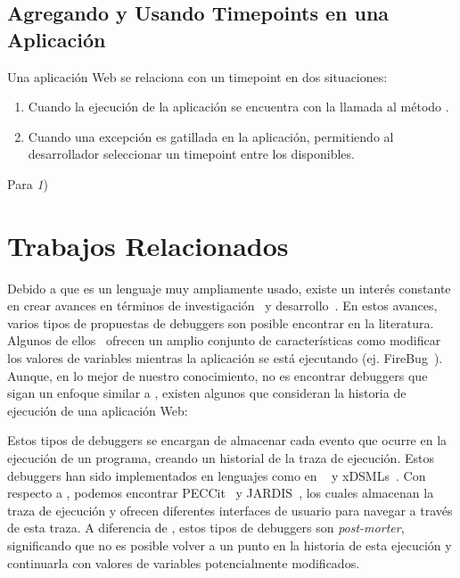 \documentclass[conference]{IEEEtran}
\begin{document}
\subsection{Agregando y Usando Timepoints en una Aplicaci\'on}
\label{sec:utime}

Una aplicaci\'on Web se relaciona con un timepoint en dos situaciones: 
\begin{enumerate}

	\item Cuando la ejecuci\'on de la aplicaci\'on se encuentra con la llamada al m\'etodo .
	
	\smallskip
	
	\item Cuando una excepci\'on es gatillada en la aplicaci\'on, permitiendo al desarrollador seleccionar un timepoint entre los disponibles. 
\end{enumerate}

\smallskip

	Para {\em 1})

\here

\section{Trabajos Relacionados}
\label{sec:rw}

Debido a que \javascript es un lenguaje muy ampliamente usado, existe un inter\'es constante en crear avances en t\'erminos de investigaci\'on~\cite{vazquesAl:ist2018,legerAl:scp2013,legerAl:scp2015,zhengAl:www2011,chargueraudAl:www2018} y desarrollo~\cite{resig:jquery,angular,mckenzie:babel,rxjs}. En estos avances, varios tipos de propuestas de debuggers son posible encontrar en la literatura. Algunos de ellos~\cite{bartonOdvarko:www2011,jsbin,nodejsInspector} ofrecen un amplio conjunto de caracter\'isticas como modificar los valores de variables mientras la aplicaci\'on se est\'a ejecutando (ej. FireBug~\cite{bartonOdvarko:www2011}). Aunque, en lo mejor de nuestro conocimiento, no es encontrar debuggers que sigan un enfoque similar a \deloreanjs, existen algunos que consideran la historia de ejecuci\'on de una aplicaci\'on Web:       

\smallskip

 Estos tipos de debuggers se encargan de almacenar cada evento que ocurre en la ejecuci\'on de un programa, creando un historial de la traza de ejecuci\'on. Estos debuggers han sido implementados en lenguajes como en \java~\cite{tod:oopsla2007} y xDSMLs~\cite{bousseAl:SLE2015}. Con respecto a  \javascript, podemos encontrar PECCit~\cite{azar:2016} y JARDIS~\cite{barrAl:fse2016}, los cuales almacenan la traza de ejecuci\'on y ofrecen diferentes interfaces de usuario para navegar a trav\'es de esta traza. A diferencia de \deloreanjs, estos tipos de debuggers son {\em post-morter}, significando que no es posible volver a un punto en la historia de esta ejecuci\'on y continuarla con valores de variables potencialmente modificados. 
\end{document}
